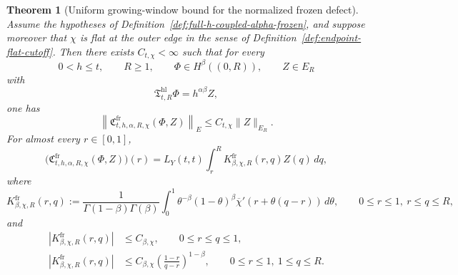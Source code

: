 \documentclass[11pt,a4paper]{amsart}
\theoremstyle{plain}
\newtheorem{theorem}{Theorem}[section]
\theoremstyle{definition}
\theoremstyle{remark}
\begin{document}
\begin{theorem}[Uniform growing-window bound for the normalized frozen defect]
\label{thm:full-h-coupled-alpha-frozen-bound}
Assume the hypotheses of Definition~\ref{def:full-h-coupled-alpha-frozen}, and suppose moreover
that \(\chi\) is flat at the outer edge in the sense of Definition~\ref{def:endpoint-flat-cutoff}.
Then there exists \(C_{t,\chi}<\infty\) such that for every
\[
0<h\le t,
\qquad
R\ge1,
\qquad
\Phi\in H^\beta((0,R)),
\qquad
Z\in E_R
\]
with
\[
\mathfrak T_{t,R}^{\mathrm{hl}}\Phi=h^{\alpha\beta}Z,
\]
one has
\begin{equation}\label{eq:full-h-coupled-alpha-frozen-bound}
\left\|
\mathfrak C_{t,h,\alpha,R,\chi}^{\mathrm{fr}}(\Phi,Z)
\right\|_{E}
\le
C_{t,\chi}\|Z\|_{E_R}.
\end{equation}
For almost every \(r\in[0,1]\),
\begin{equation}\label{eq:full-h-coupled-alpha-frozen-kernel}
\bigl(
\mathfrak C_{t,h,\alpha,R,\chi}^{\mathrm{fr}}(\Phi,Z)
\bigr)(r)
=
L_Y(t,t)\int_r^R
K_{\beta,\chi,R}^{\mathrm{fr}}(r,q)Z(q)\,dq,
\end{equation}
where
\begin{equation}\label{eq:full-h-coupled-alpha-frozen-kernel-def}
K_{\beta,\chi,R}^{\mathrm{fr}}(r,q)
:=
\frac{1}{\Gamma(1-\beta)\Gamma(\beta)}
\int_0^1
\theta^{-\beta}(1-\theta)^\beta
\overline\chi'(r+\theta(q-r))\,d\theta,
\qquad
0\le r\le1,\ r\le q\le R,
\end{equation}
and
\begin{align}
\left|
K_{\beta,\chi,R}^{\mathrm{fr}}(r,q)
\right|
&\le
C_{\beta,\chi},
\qquad 0\le r\le q\le 1,
\label{eq:full-h-coupled-alpha-frozen-kernel-local}\\
\left|
K_{\beta,\chi,R}^{\mathrm{fr}}(r,q)
\right|
&\le
C_{\beta,\chi}
\left(
\frac{1-r}{q-r}
\right)^{1-\beta},
\qquad 0\le r\le1,\ 1\le q\le R.
\label{eq:full-h-coupled-alpha-frozen-kernel-tail}
\end{align}
\end{theorem}
\end{document}
